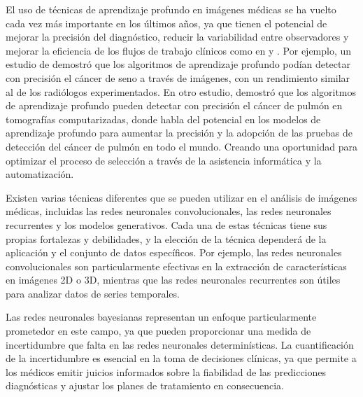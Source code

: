 \documentclass[10pt, oneside, a4paper]{article}
\begin{document}
	El uso de técnicas de aprendizaje profundo en imágenes médicas se ha vuelto cada vez más importante en los últimos años, ya que tienen el potencial de mejorar la precisión del diagnóstico, reducir la variabilidad entre observadores y mejorar la eficiencia de los flujos de trabajo clínicos como en \cite{LUNDERVOLD2019102} y \cite{doi:10.1146/annurev-bioeng-071516-044442}. Por ejemplo, un estudio de \cite{McKinney2020} demostró que los algoritmos de aprendizaje profundo podían detectar con precisión el cáncer de seno a través de imágenes, con un rendimiento similar al de los radiólogos experimentados. En otro estudio, \cite{Ardila2019} demostró que los algoritmos de aprendizaje profundo pueden detectar con precisión el cáncer de pulmón en tomografías computarizadas, donde habla del potencial en los modelos de aprendizaje profundo para aumentar la precisión y la adopción de las pruebas de detección del cáncer de pulmón en todo el mundo. Creando una oportunidad para optimizar el proceso de selección a través de la asistencia informática y la automatización.
	
	Existen varias técnicas diferentes que se pueden utilizar en el análisis de imágenes médicas, incluidas las redes neuronales convolucionales, las redes neuronales recurrentes y los modelos generativos. Cada una de estas técnicas tiene sus propias fortalezas y debilidades, y la elección de la técnica dependerá de la aplicación y el conjunto de datos específicos. Por ejemplo, las redes neuronales convolucionales son particularmente efectivas en la extracción de características en imágenes 2D o 3D, mientras que las redes neuronales recurrentes son útiles para analizar datos de series temporales.
	
	Las redes neuronales bayesianas representan un enfoque particularmente prometedor en este campo, ya que pueden proporcionar una medida de incertidumbre que falta en las redes neuronales determinísticas. La cuantificación de la incertidumbre es esencial en la toma de decisiones clínicas, ya que permite a los médicos emitir juicios informados sobre la fiabilidad de las predicciones diagnósticas y ajustar los planes de tratamiento en consecuencia. 
	
	
\end{document}
